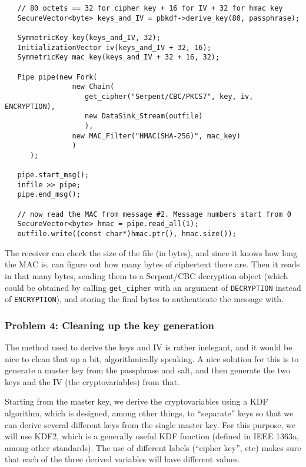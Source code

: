 \documentclass{article}
\newcommand{\type}[1]{\texttt{#1}}
\begin{document}
\begin{verbatim}
   // 80 octets == 32 for cipher key + 16 for IV + 32 for hmac key
   SecureVector<byte> keys_and_IV = pbkdf->derive_key(80, passphrase);

   SymmetricKey key(keys_and_IV, 32);
   InitializationVector iv(keys_and_IV + 32, 16);
   SymmetricKey mac_key(keys_and_IV + 32 + 16, 32);

   Pipe pipe(new Fork(
                new Chain(
                   get_cipher("Serpent/CBC/PKCS7", key, iv, ENCRYPTION),
                   new DataSink_Stream(outfile)
                   ),
                new MAC_Filter("HMAC(SHA-256)", mac_key)
                )
      );

   pipe.start_msg();
   infile >> pipe;
   pipe.end_msg();

   // now read the MAC from message #2. Message numbers start from 0
   SecureVector<byte> hmac = pipe.read_all(1);
   outfile.write((const char*)hmac.ptr(), hmac.size());
\end{verbatim}

The receiver can check the size of the file (in bytes), and since it knows how
long the MAC is, can figure out how many bytes of ciphertext there are. Then it
reads in that many bytes, sending them to a Serpent/CBC decryption object
(which could be obtained by calling \verb|get_cipher| with an argument of
\type{DECRYPTION} instead of \type{ENCRYPTION}), and storing the final bytes to
authenticate the message with.

\subsubsection{Problem 4: Cleaning up the key generation}

The method used to derive the keys and IV is rather inelegant, and it would be
nice to clean that up a bit, algorithmically speaking. A nice solution for this
is to generate a master key from the passphrase and salt, and then generate the
two keys and the IV (the cryptovariables) from that.

Starting from the master key, we derive the cryptovariables using a KDF
algorithm, which is designed, among other things, to ``separate'' keys so that
we can derive several different keys from the single master key. For this
purpose, we will use KDF2, which is a generally useful KDF function (defined in
IEEE 1363a, among other standards). The use of different labels (``cipher
key'', etc) makes sure that each of the three derived variables will have
different values.
\end{document}
